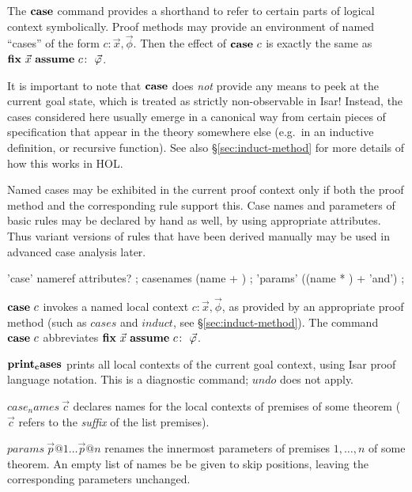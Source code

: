 \medskip

The ${\mathord{\mathbf{case}}}$ command provides a shorthand to refer to certain parts of
logical context symbolically.  Proof methods may provide an environment of
named ``cases'' of the form $c\colon \vec x, \vec \phi$.  Then the effect of
${\mathord{\mathbf{case}}}~c$ is exactly the same as $\FIX{\vec x}~\ASSUME{c}{\vec\phi}$.

It is important to note that ${\mathord{\mathbf{case}}}$ does \emph{not} provide any means to
peek at the current goal state, which is treated as strictly non-observable in
Isar!  Instead, the cases considered here usually emerge in a canonical way
from certain pieces of specification that appear in the theory somewhere else
(e.g.\ in an inductive definition, or recursive function).  See also
\S\ref{sec:induct-method} for more details of how this works in HOL.

\medskip

Named cases may be exhibited in the current proof context only if both the
proof method and the corresponding rule support this.  Case names and
parameters of basic rules may be declared by hand as well, by using
appropriate attributes.  Thus variant versions of rules that have been derived
manually may be used in advanced case analysis later.


\begin{rail}
  'case' nameref attributes?
  ;
  casenames (name + )
  ;
  'params' ((name * ) + 'and')
  ;
\end{rail}

\begin{descr}
\item [${\mathord{\mathbf{case}}}~c$] invokes a named local context $c\colon \vec x, \vec \phi$,
  as provided by an appropriate proof method (such as $cases$ and $induct$,
  see \S\ref{sec:induct-method}).  The command ${\mathord{\mathbf{case}}}~c$ abbreviates
  $\FIX{\vec x}~\ASSUME{c}{\vec\phi}$.
\item [${\mathord{\mathbf{print_cases}}}$] prints all local contexts of the current
  goal context, using Isar proof language notation.  This is a diagnostic
  command; $undo$ does not apply.
\item [$case_names~\vec c$] declares names for the local contexts of premises
  of some theorem ($\vec c$ refers to the \emph{suffix} of the list premises).
\item [$params~\vec p@1 \dots \vec p@n$] renames the innermost parameters of
  premises $1, \dots, n$ of some theorem.  An empty list of names be be given
  to skip positions, leaving the corresponding parameters unchanged.
\end{descr}


